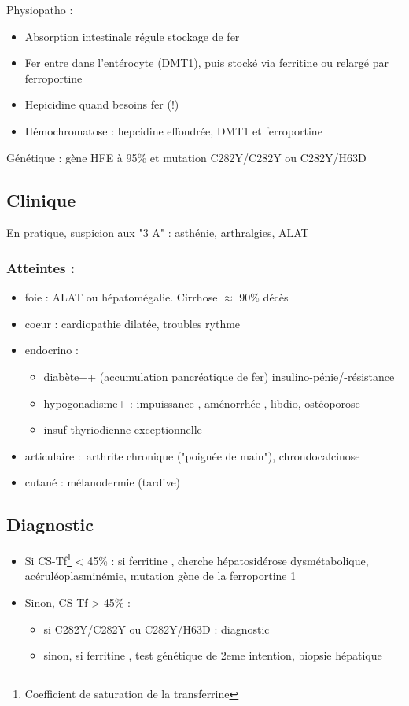 \documentclass[11pt]{article}
\begin{document}
Physiopatho : 
\begin{itemize}
\item Absorption intestinale régule stockage de fer
\item Fer entre dans l'entérocyte (DMT1), puis stocké via ferritine ou relargé par ferroportine
\item Hepicidine \dec quand besoins fer \inc (!)
\item Hémochromatose : hepcidine effondrée, DMT1 et ferroportine \inc
\end{itemize}

Génétique : gène HFE à 95\% et mutation C282Y/C282Y ou C282Y/H63D

\subsection{Clinique}
\label{sec:org4deb681}
En pratique, suspicion aux "3 A" : asthénie, arthralgies, \inc ALAT

\subsubsection{Atteintes :}
\label{sec:orgf87d27f}
\begin{itemize}
\item foie : \inc ALAT ou hépatomégalie. Cirrhose \(\approx\) 90\% décès
\item coeur : cardiopathie dilatée, troubles rythme
\item endocrino :
\begin{itemize}
\item diabète++ (accumulation pancréatique de fer) insulino-pénie/-résistance
\item hypogonadisme+ : impuissance \male, aménorrhée \female, \dec libdio,
ostéoporose
\item insuf thyriodienne exceptionnelle
\end{itemize}
\item articulaire : arthrite chronique ("poignée de main"), chrondocalcinose
\item cutané : mélanodermie (tardive)
\end{itemize}


\subsection{Diagnostic}
\label{sec:org9a56804}
\begin{itemize}
\item Si CS-Tf\footnote{Coefficient de saturation de la transferrine} < 45\% : si ferritine \inc, cherche hépatosidérose dysmétabolique,
acéruléoplasminémie, mutation gène de la ferroportine 1
\item Sinon, CS-Tf > 45\% : 
\begin{itemize}
\item si C282Y/C282Y ou C282Y/H63D : diagnostic
\item sinon, si ferritine \inc, test génétique de 2eme intention, biopsie
hépatique
\end{itemize}
\end{itemize}
\end{document}
